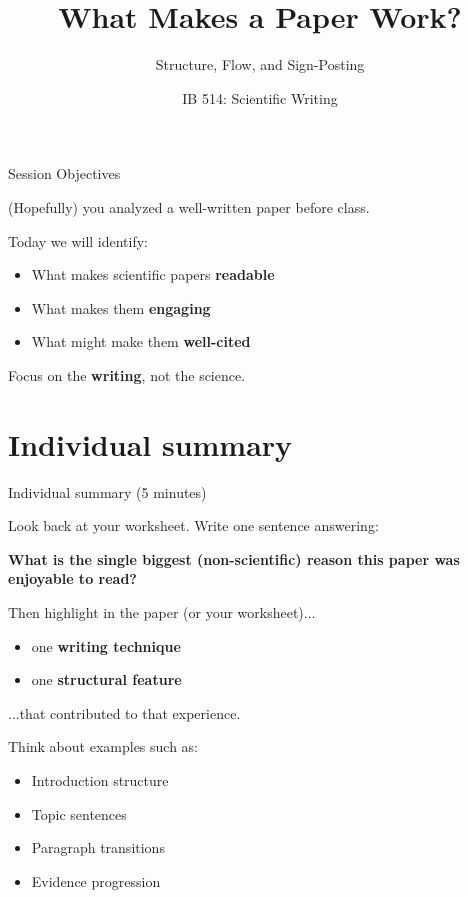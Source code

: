 \documentclass{beamer}
\title{What Makes a Paper Work?}
\subtitle{Structure, Flow, and Sign-Posting}
\author[]{IB 514: Scientific Writing}
\date{}
\begin{document}
\frame{\titlepage}


\begin{frame}{Session Objectives}

(Hopefully) you analyzed a well-written paper before class.

\vspace{0.5cm}

Today we will identify:

\begin{itemize}
\item What makes scientific papers \textbf{readable}
\item What makes them \textbf{engaging}
\item What might make them \textbf{well-cited}
\end{itemize}

\vspace{0.5cm}

Focus on the \textbf{writing}, not the science.

\end{frame}


\section{Individual summary}
\begin{frame}{Individual summary (5 minutes)}

Look back at your worksheet.
Write one sentence answering:

\vspace{0.3cm}

\textbf{What is the single biggest (non-scientific) reason this paper was enjoyable to read?}

\vspace{0.5cm}

Then highlight in the paper (or your worksheet)...

\begin{itemize}
\item one \textbf{writing technique}
\item one \textbf{structural feature}
\end{itemize}

\hspace{2cm}...that contributed to that experience.


\vspace{0.5cm}

Think about examples such as:

\begin{itemize}
\item Introduction structure
\item Topic sentences
\item Paragraph transitions
\item Evidence progression
\end{itemize}

\end{frame}
\end{document}
